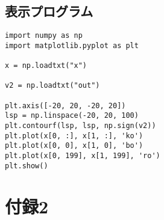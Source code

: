 \documentclass[9pt]{ltjsarticle}
\begin{document}
\subsection*{表示プログラム}
\tiny
\begin{verbatim}
import numpy as np
import matplotlib.pyplot as plt

x = np.loadtxt("x")

v2 = np.loadtxt("out")

plt.axis([-20, 20, -20, 20])
lsp = np.linspace(-20, 20, 100)
plt.contourf(lsp, lsp, np.sign(v2))
plt.plot(x[0, :], x[1, :], 'ko')   
plt.plot(x[0, 0], x[1, 0], 'bo')   
plt.plot(x[0, 199], x[1, 199], 'ro')   
plt.show()
\end{verbatim}

\normalsize

\section*{付録2}
\end{document}
